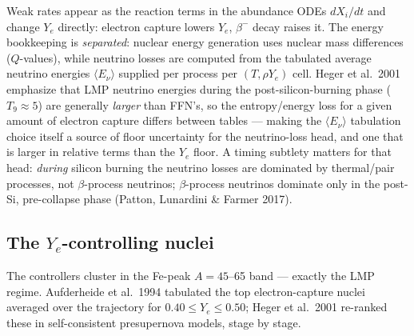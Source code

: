\documentclass[11pt]{article}
\begin{document}
Weak rates appear as the reaction terms in the abundance ODEs $dX_i/dt$ and change $Y_e$ directly: electron capture lowers $Y_e$, $\beta^-$ decay raises it. The energy bookkeeping is \emph{separated}: nuclear energy generation uses nuclear mass differences ($Q$-values), while neutrino losses are computed from the tabulated average neutrino energies $\langle E_\nu\rangle$ supplied per process per $(T, \rho Y_e)$ cell. Heger et al.\ 2001 emphasize that LMP neutrino energies during the post-silicon-burning phase ($T_9 \approx 5$) are generally \emph{larger} than FFN's, so the entropy/energy loss for a given amount of electron capture differs between tables --- making the $\langle E_\nu\rangle$ tabulation choice itself a source of floor uncertainty for the neutrino-loss head, and one that is larger in relative terms than the $Y_e$ floor. A timing subtlety matters for that head: \emph{during} silicon burning the neutrino losses are dominated by thermal/pair processes, not $\beta$-process neutrinos; $\beta$-process neutrinos dominate only in the post-Si, pre-collapse phase (Patton, Lunardini \& Farmer 2017).

\subsection{The \texorpdfstring{$Y_e$}{Ye}-controlling nuclei}

The controllers cluster in the Fe-peak $A = 45$--65 band --- exactly the LMP regime. Aufderheide et al.\ 1994 tabulated the top electron-capture nuclei averaged over the trajectory for $0.40 \le Y_e \le 0.50$; Heger et al.\ 2001 re-ranked these in self-consistent presupernova models, stage by stage.
\end{document}
